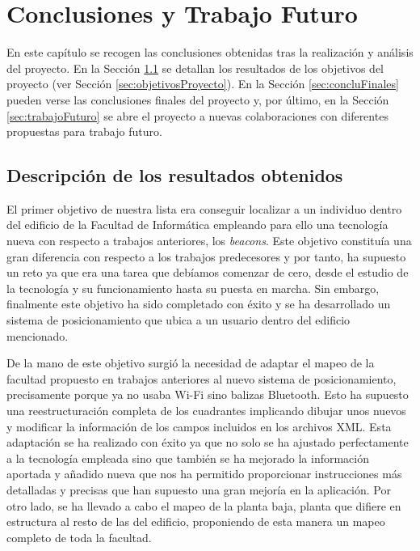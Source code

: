 \chapter{Conclusiones y Trabajo Futuro}
\label{cap:conclusiones}

En este capítulo se recogen las conclusiones obtenidas tras la realización y análisis del proyecto. En la Sección \ref{sec:descResult} se detallan los resultados de los objetivos del proyecto (ver Sección \ref{sec:objetivosProyecto}). En la Sección \ref{sec:concluFinales} pueden verse las conclusiones finales del proyecto y, por último, en la Sección \ref{sec:trabajoFuturo} se abre el proyecto a nuevas colaboraciones con diferentes propuestas para trabajo futuro.

\section{Descripción de los resultados obtenidos}
\label{sec:descResult}
El primer objetivo de nuestra lista era conseguir localizar a un individuo dentro del edificio de la Facultad de Informática empleando para ello una tecnología nueva con respecto a trabajos anteriores, los \textit{beacons}. Este objetivo constituía una gran diferencia con respecto a los trabajos predecesores y por tanto, ha
supuesto un reto ya que era una tarea que debíamos comenzar de cero, desde el estudio de la tecnología y su funcionamiento hasta su puesta en marcha. Sin embargo, finalmente este objetivo ha sido completado con éxito y se ha desarrollado un sistema de posicionamiento que ubica a un usuario dentro del edificio mencionado.

De la mano de este objetivo surgió la necesidad de adaptar el mapeo de la facultad propuesto en trabajos anteriores al nuevo sistema de posicionamiento, precisamente porque ya no usaba Wi-Fi sino balizas Bluetooth. Esto ha supuesto una reestructuración completa de los cuadrantes implicando dibujar unos nuevos y modificar la información de los campos incluidos en los archivos XML. Esta adaptación se ha realizado con éxito ya que no solo se ha ajustado perfectamente a la tecnología empleada sino que también se ha mejorado la información aportada y añadido nueva que nos ha permitido proporcionar instrucciones más detalladas y precisas que han supuesto una gran mejoría en la aplicación. Por otro lado, se ha llevado a cabo el mapeo de la planta baja, planta que difiere en estructura al resto de las del edificio, proponiendo de esta manera un mapeo completo de toda la facultad.

